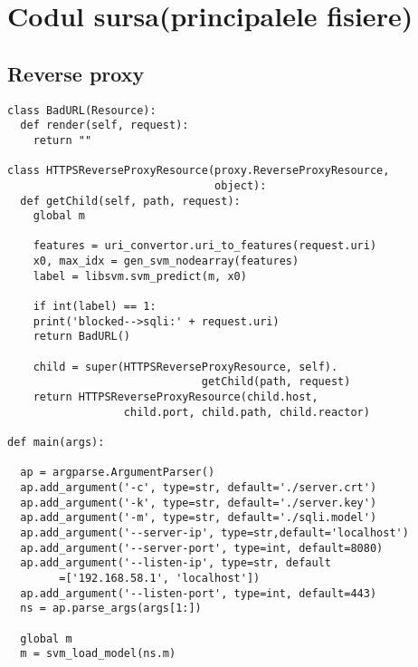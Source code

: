 \appendix

\chapter{Codul sursa(principalele fisiere)}
\section{Reverse proxy}

\begin{lstlisting}
class BadURL(Resource):
  def render(self, request):
    return ""

class HTTPSReverseProxyResource(proxy.ReverseProxyResource, 
                                object):
  def getChild(self, path, request):
    global m

    features = uri_convertor.uri_to_features(request.uri)
    x0, max_idx = gen_svm_nodearray(features)
    label = libsvm.svm_predict(m, x0)

    if int(label) == 1:
    print('blocked-->sqli:' + request.uri)
    return BadURL()

    child = super(HTTPSReverseProxyResource, self).
                              getChild(path, request)
    return HTTPSReverseProxyResource(child.host, 
                  child.port, child.path, child.reactor)

def main(args):

  ap = argparse.ArgumentParser()
  ap.add_argument('-c', type=str, default='./server.crt')
  ap.add_argument('-k', type=str, default='./server.key')
  ap.add_argument('-m', type=str, default='./sqli.model')
  ap.add_argument('--server-ip', type=str,default='localhost')
  ap.add_argument('--server-port', type=int, default=8080)
  ap.add_argument('--listen-ip', type=str, default
  		=['192.168.58.1', 'localhost'])
  ap.add_argument('--listen-port', type=int, default=443)
  ns = ap.parse_args(args[1:])

  global m
  m = svm_load_model(ns.m)


\end{lstlisting}
